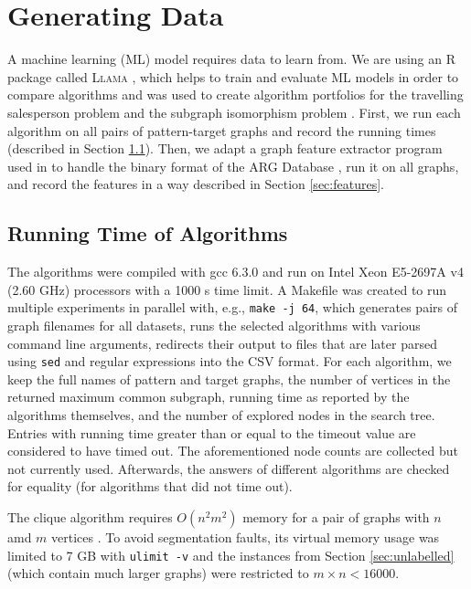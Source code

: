 \documentclass{l4proj}
\theoremstyle{definition}
\theoremstyle{remark}
\begin{document}
\chapter{Generating Data}
A machine learning (ML) model requires data to learn from. We are using an R
package called \textsc{Llama} \cite{kotthoff_llama_2013, llama}, which helps to train
and evaluate ML models in order to compare algorithms and was used to create
algorithm portfolios for the travelling salesperson problem
\cite{DBLP:conf/lion/KotthoffKHT15} and the subgraph isomorphism problem
\cite{DBLP:conf/lion/KotthoffMS16}. First, we run each algorithm on all pairs of
pattern-target graphs and record the running times (described in Section
\ref{sec:runtimes}). Then, we adapt a graph feature extractor program used in
\cite{DBLP:conf/lion/KotthoffMS16} to handle the binary format of the ARG
Database \cite{foggia2001-2, DBLP:journals/prl/SantoFSV03}, run it on all
graphs, and record the features in a way described in Section
\ref{sec:features}.

\section{Running Time of Algorithms} \label{sec:runtimes}

The algorithms were compiled with gcc 6.3.0 and run on Intel Xeon E5-2697A v4
(2.60 GHz) processors with a \num{1000} s time limit. A Makefile was created to
run multiple experiments in parallel with, e.g., \texttt{make -j 64}, which
generates pairs of graph filenames for all datasets, runs the selected
algorithms with various command line arguments, redirects their output to files
that are later parsed using \texttt{sed} and regular expressions into the CSV
format. For each algorithm, we keep the full names of pattern and target graphs,
the number of vertices in the returned maximum common subgraph, running time as
reported by the algorithms themselves, and the number of explored nodes in the
search tree. Entries with running time greater than or equal to the timeout
value are considered to have timed out. The aforementioned node counts are
collected but not currently used. Afterwards, the answers of different
algorithms are checked for equality (for algorithms that did not time out).

The clique algorithm requires $O(n^2m^2)$ memory for a pair of graphs with $n$
amd $m$ vertices \cite{DBLP:conf/aaai/HoffmannMR17, DBLP:conf/cp/McCreeshNPS16}.
To avoid segmentation faults, its virtual memory usage was limited to 7 GB with
\texttt{ulimit -v} and the instances from Section \ref{sec:unlabelled} (which
contain much larger graphs) were restricted to $m \times n < \num{16000}$.
\end{document}
